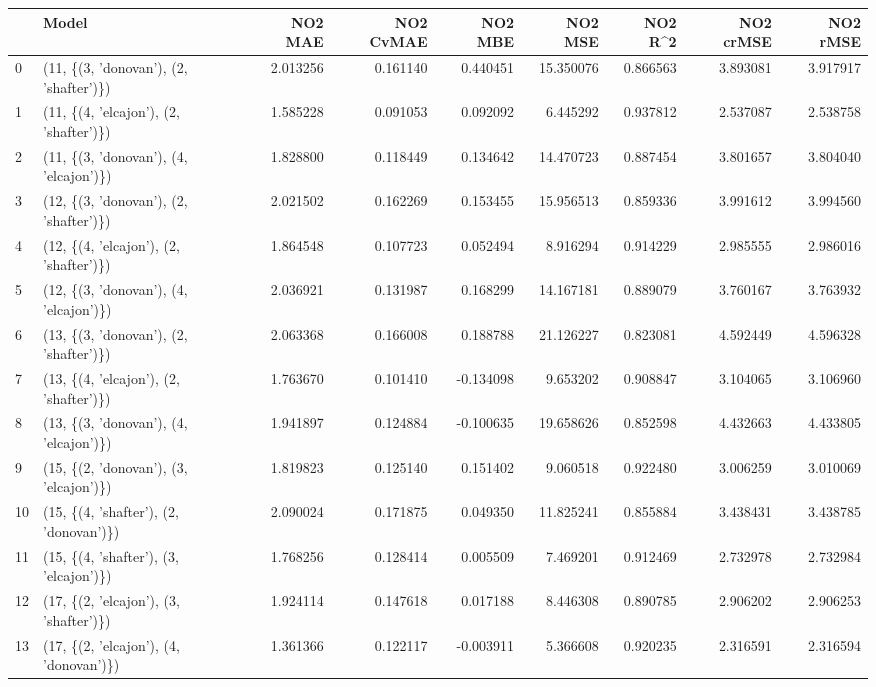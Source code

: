 \begin{tabular}{llrrrrrrr}
\toprule
{} &                                   Model &   NO2 MAE &  NO2 CvMAE &   NO2 MBE &    NO2 MSE &   NO2 R\textasciicircum2 &  NO2 crMSE &  NO2 rMSE \\
\midrule
0  &  (11, \{(3, 'donovan'), (2, 'shafter')\}) &  2.013256 &   0.161140 &  0.440451 &  15.350076 &  0.866563 &   3.893081 &  3.917917 \\
1  &  (11, \{(4, 'elcajon'), (2, 'shafter')\}) &  1.585228 &   0.091053 &  0.092092 &   6.445292 &  0.937812 &   2.537087 &  2.538758 \\
2  &  (11, \{(3, 'donovan'), (4, 'elcajon')\}) &  1.828800 &   0.118449 &  0.134642 &  14.470723 &  0.887454 &   3.801657 &  3.804040 \\
3  &  (12, \{(3, 'donovan'), (2, 'shafter')\}) &  2.021502 &   0.162269 &  0.153455 &  15.956513 &  0.859336 &   3.991612 &  3.994560 \\
4  &  (12, \{(4, 'elcajon'), (2, 'shafter')\}) &  1.864548 &   0.107723 &  0.052494 &   8.916294 &  0.914229 &   2.985555 &  2.986016 \\
5  &  (12, \{(3, 'donovan'), (4, 'elcajon')\}) &  2.036921 &   0.131987 &  0.168299 &  14.167181 &  0.889079 &   3.760167 &  3.763932 \\
6  &  (13, \{(3, 'donovan'), (2, 'shafter')\}) &  2.063368 &   0.166008 &  0.188788 &  21.126227 &  0.823081 &   4.592449 &  4.596328 \\
7  &  (13, \{(4, 'elcajon'), (2, 'shafter')\}) &  1.763670 &   0.101410 & -0.134098 &   9.653202 &  0.908847 &   3.104065 &  3.106960 \\
8  &  (13, \{(3, 'donovan'), (4, 'elcajon')\}) &  1.941897 &   0.124884 & -0.100635 &  19.658626 &  0.852598 &   4.432663 &  4.433805 \\
9  &  (15, \{(2, 'donovan'), (3, 'elcajon')\}) &  1.819823 &   0.125140 &  0.151402 &   9.060518 &  0.922480 &   3.006259 &  3.010069 \\
10 &  (15, \{(4, 'shafter'), (2, 'donovan')\}) &  2.090024 &   0.171875 &  0.049350 &  11.825241 &  0.855884 &   3.438431 &  3.438785 \\
11 &  (15, \{(4, 'shafter'), (3, 'elcajon')\}) &  1.768256 &   0.128414 &  0.005509 &   7.469201 &  0.912469 &   2.732978 &  2.732984 \\
12 &  (17, \{(2, 'elcajon'), (3, 'shafter')\}) &  1.924114 &   0.147618 &  0.017188 &   8.446308 &  0.890785 &   2.906202 &  2.906253 \\
13 &  (17, \{(2, 'elcajon'), (4, 'donovan')\}) &  1.361366 &   0.122117 & -0.003911 &   5.366608 &  0.920235 &   2.316591 &  2.316594 \\

\end{tabular}
